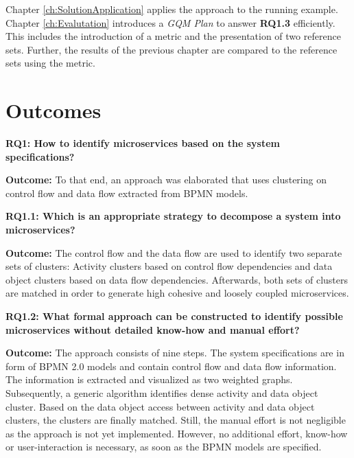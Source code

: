 Chapter \ref{ch:SolutionApplication} applies the approach to the running example. Chapter \ref{ch:Evalutation} introduces a \textit{GQM Plan} to answer \textbf{RQ1.3} efficiently. This includes the introduction of a metric and the presentation of two reference sets. Further, the results of the previous chapter are compared to the reference sets using the metric.


\section{Outcomes}


\vspace{0.5cm}
\par
\begingroup

\noindent
\textbf{RQ1: How to identify microservices based on the system specifications? }

\vspace{0.3cm}
\noindent
\textbf{Outcome:} To that end, an approach was elaborated that uses clustering on control flow and data flow extracted from BPMN models.

\endgroup
\vspace{0.5cm}


\vspace{0.5cm}
\par
\begingroup

\noindent
\textbf{RQ1.1: Which is an appropriate strategy to decompose a system into microservices? }

\vspace{0.3cm}
\noindent
\textbf{Outcome:} The control flow and the data flow are used to identify two separate sets of clusters: Activity clusters based on control flow dependencies and data object clusters based on data flow dependencies. Afterwards, both sets of clusters are matched in order to generate high cohesive and loosely coupled microservices. 

\endgroup
\vspace{0.5cm}

\vspace{0.5cm}
\par
\begingroup

\noindent
\textbf{RQ1.2: What formal approach can be constructed to identify possible microservices without detailed know-how and manual effort? }

\vspace{0.3cm}
\noindent
\textbf{Outcome:} The approach consists of nine steps. The system specifications are in form of BPMN 2.0 models and contain control flow and data flow information. The information is extracted and visualized as two weighted graphs. Subsequently, a generic algorithm identifies dense activity and data object cluster. Based on the data object access between activity and data object clusters, the clusters are finally matched. Still, the manual effort is not negligible as the approach is not yet implemented. However, no additional effort, know-how or user-interaction is necessary, as soon as the BPMN models are specified. 



